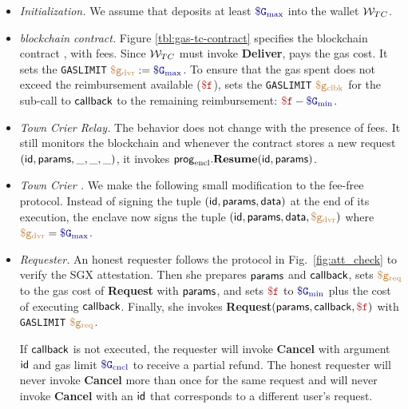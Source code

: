 \begin{itemize}[leftmargin=1.5em]
  \setlength{\itemsep}{0pt}
  \setlength{\parsep}{0pt}
  \item {\it Initialization.}
    We assume that \tc deposits at least $\constgasmax$ into the wallet $\tcadd$.

  \item {\it \tcs blockchain contract.}
    Figure \ref{tbl:gas-tc-contract} specifies the \tc blockchain contract \tcont, with fees.
    Since $\tcadd$ must invoke {\bf Deliver}, \tc pays the gas cost.
    It sets the {\tt GASLIMIT} $\gasdeliver := \constgasmax$.
    To ensure that the gas spent does not exceed the reimbursement available ($\fee$),
    \tcont sets the {\tt GASLIMIT} $\textcolor{brown}{\tt \$g_\text{clbk}}$ for the sub-call to ${\sf callback}$ to the remaining reimbursement: $\fee - \constgasmin$.

  \item {\it Town Crier Relay.}
    The \medname behavior does not change with the presence of fees.
    It still monitors the blockchain and whenever the contract \tcont stores a new request $({\sf id}, {\sf params}, \_, \_, \_)$,
    it invokes ${\sf prog}_{\textrm{encl}}.\textbf{Resume}({\sf id}, {\sf params})$.

  \item {\it Town Crier \encname.}
    We make the following small modification to the fee-free protocol.
    Instead of signing the tuple $({\sf id}, {\sf params}, {\sf data})$ at the end of its execution,
    the enclave now signs the tuple $({\sf id}, {\sf params}, {\sf data}, \textcolor{brown}{\tt \$g_\text{dvr}})$ where $\gasdeliver = \constgasmax$.

  \item {\it Requester.}
    An honest requester follows the protocol in Fig.~\ref{fig:att_check} to verify the SGX attestation.
    Then she prepares ${\sf params}$ and ${\sf callback}$, sets $\textcolor{brown}{\tt \$g_\text{req}}$ to the gas cost of {\bf Request} with ${\sf params}$,
    and sets $\fee$ to $\constgasmin$ plus the cost of executing ${\sf callback}$.
Finally, she invokes {\bf Request}$(\dgform, \dgcallback, \fee)$ with {\tt GASLIMIT} $\textcolor{brown}{\tt \$g_\text{req}}$.

    If ${\sf callback}$ is not executed, the requester will invoke {\bf Cancel} with argument ${\sf id}$ and gas limit $\constgasinvokecancel$ to receive a partial refund.
    The honest requester will never invoke {\bf Cancel} more than once for the same request
    and will never invoke {\bf Cancel} with an ${\sf id}$ that corresponds to a different user's request.
\end{itemize}

